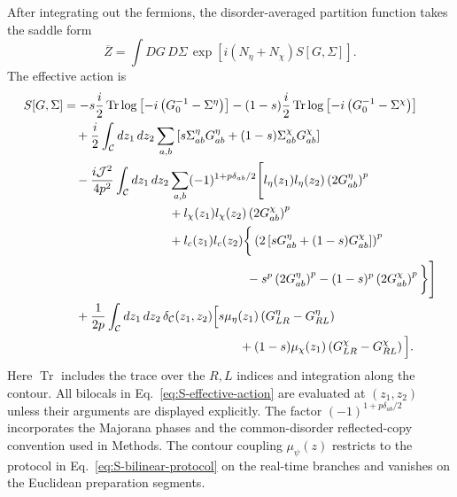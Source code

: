 \documentclass[11pt,a4paper]{article}
\begin{document}
After integrating out the fermions, the disorder-averaged partition function
takes the saddle form
\begin{equation}
\overline Z
=
\int DG\,D\Sigma\,
\exp\left[
i(N_\eta+N_\chi)S[G,\Sigma]
\right].
\label{eq:S-bilocal-saddle}
\end{equation}
The effective action is
\begin{equation}
\begin{aligned}
S[G,\Sigma]
&=
-s\frac{i}{2}
\operatorname{Tr}\log
\left[
-i\left(G_0^{-1}-\Sigma^\eta\right)
\right]
-(1-s)\frac{i}{2}
\operatorname{Tr}\log
\left[
-i\left(G_0^{-1}-\Sigma^\chi\right)
\right]
\\
&\quad
+\frac{i}{2}
\int_{\mathcal C}dz_1\,dz_2
\sum_{a,b}
\left[
s\Sigma^\eta_{ab}G^\eta_{ab}
+(1-s)\Sigma^\chi_{ab}G^\chi_{ab}
\right]
\\
&\quad
-\frac{i\mathcal J^2}{4p^2}
\int_{\mathcal C}dz_1\,dz_2
\sum_{a,b}
(-1)^{1+p\delta_{ab}/2}
\Bigg[
l_\eta(z_1)l_\eta(z_2)
\left(2G^\eta_{ab}\right)^p
\\
&\hspace{3.0cm}
+l_\chi(z_1)l_\chi(z_2)
\left(2G^\chi_{ab}\right)^p
\\
&\hspace{3.0cm}
+l_c(z_1)l_c(z_2)
\bigg\{
\left(
2\left[sG^\eta_{ab}+(1-s)G^\chi_{ab}\right]
\right)^p
\\
&\hspace{5.2cm}
-s^p\left(2G^\eta_{ab}\right)^p
-(1-s)^p\left(2G^\chi_{ab}\right)^p
\bigg\}
\Bigg]
\\
&\quad
+\frac{1}{2p}
\int_{\mathcal C}dz_1\,dz_2\,
\delta_{\mathcal C}(z_1,z_2)
\Big[
s\mu_\eta(z_1)
\left(G^\eta_{LR}-G^\eta_{RL}\right)
\\
&\hspace{5.0cm}
+(1-s)\mu_\chi(z_1)
\left(G^\chi_{LR}-G^\chi_{RL}\right)
\Big].
\end{aligned}
\label{eq:S-effective-action}
\end{equation}
Here \(\operatorname{Tr}\) includes the trace over the \(R,L\) indices and
integration along the contour. All bilocals in
Eq.~\eqref{eq:S-effective-action} are evaluated at \((z_1,z_2)\) unless their
arguments are displayed explicitly. The factor
\((-1)^{1+p\delta_{ab}/2}\) incorporates the Majorana phases and the
common-disorder reflected-copy convention used in Methods. The contour
coupling \(\mu_\psi(z)\) restricts to the protocol in
Eq.~\eqref{eq:S-bilinear-protocol} on the real-time branches and vanishes on
the Euclidean preparation segments.
\end{document}
